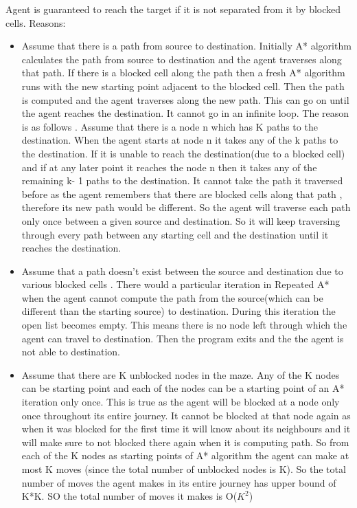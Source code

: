 \documentclass[a4 paper]{article}
\begin{document}
Agent is guaranteed to reach the target if it is not separated from it by blocked cells. Reasons: 
\begin{itemize}
    \item Assume that there is a path from source to destination. Initially A* algorithm calculates the path from source to destination and the agent traverses along that path. If there is a blocked cell along the path then a fresh A* algorithm runs with the new starting point adjacent to the blocked cell. Then the path is computed and the agent traverses along the new path. This can go on until the agent reaches the destination. It cannot go in an infinite loop. The reason is as follows . Assume that there is a node n which has K paths to the destination. When the agent starts at node n it takes any of the k paths to the destination. If it is unable to reach the destination(due to a blocked cell) and if at any later point it reaches the node n then it takes any of the remaining k- 1 paths to the destination. It cannot take the path it traversed before as the agent remembers that there are blocked cells along that path , therefore its new path would be different. So the agent will traverse each path only once between a given source and destination. So it will keep traversing through every path between any starting cell and the destination until it reaches the destination.
    \item Assume that a path doesn't exist between the source and destination due to various blocked cells . There would a particular iteration in Repeated A* when the agent cannot compute the path from the source(which can be different than the starting source) to destination. During this iteration the open list becomes empty. This means there is no node left through which the agent can travel to destination. Then the program exits and the the agent is not able to destination.
    
    \item Assume that there are K unblocked nodes in the maze. Any of the K nodes can be starting point and each of the nodes can be a starting point of an A* iteration only once. This is true as the agent will be blocked at a node only once throughout its entire journey. It cannot be blocked at that node again as when it was blocked for the first time it will know about its neighbours and it will make sure to not blocked there again when it is computing path. So from each of the K nodes as starting points of A* algorithm the agent can make at most K moves (since the total number of unblocked nodes is K). So the total number of moves the agent makes in its entire journey has upper bound of K*K. SO the total number of moves it makes is O($K^2$)
\end{itemize}
\end{document}
